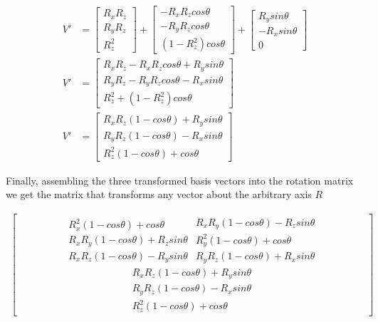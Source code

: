 \documentclass{article}
\begin{document}
    \begin{align}
        V' &= 
        \begin{bmatrix} R_xR_z \\ R_yR_z \\ R_z^2 \end{bmatrix} +  
        \begin{bmatrix} -R_xR_zcos\theta \\  -R_yR_zcos\theta \\ (1-R_z^2)cos\theta \end{bmatrix} +
        \begin{bmatrix} R_ysin\theta \\ -R_xsin\theta \\ 0 \end{bmatrix} \\
        V' &= 
        \begin{bmatrix}
            R_xR_z - R_xR_zcos\theta + R_ysin\theta \\ 
            R_yR_z - R_yR_zcos\theta - R_xsin\theta \\ 
            R_z^2  + (1-R_z^2)cos\theta   
        \end{bmatrix} \\
        V' &= 
        \begin{bmatrix}
            R_xR_z(1 - cos\theta) + R_ysin\theta \\ 
            R_yR_z(1 - cos\theta) - R_xsin\theta \\ 
            R_z^2(1 - cos\theta) + cos\theta  
        \end{bmatrix} \label{eq:zaxisAfterRotation}
    \end{align}


    \noindent Finally, assembling the three transformed basis vectors into the rotation matrix we get the matrix that transforms any vector about
    the arbitrary axis $R$
    
    \begin{align}
        \begin{bmatrix}
            \begin{matrix}
                R_x^2(1 - cos\theta) + cos\theta \\ 
                R_xR_y(1 - cos\theta) + R_zsin\theta \\ 
                R_xR_z(1 - cos\theta) - R_ysin\theta  
            \end{matrix}
            \begin{matrix}
                R_xR_y(1 - cos\theta) - R_zsin\theta \\ 
                R_y^2(1 - cos\theta) + cos\theta \\ 
                R_yR_z(1 - cos\theta) + R_xsin\theta  
            \end{matrix}
            \begin{matrix}
                R_xR_z(1 - cos\theta) + R_ysin\theta \\ 
                R_yR_z(1 - cos\theta) - R_xsin\theta \\ 
                R_z^2(1 - cos\theta) + cos\theta  
            \end{matrix}
        \end{bmatrix}
    \end{align}
\end{document}
